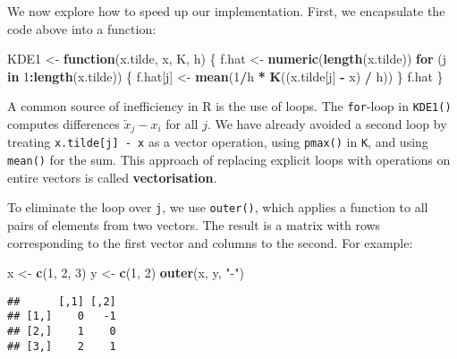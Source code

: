 \documentclass[
  a4paper,
]{article}
\newenvironment{Shaded}{\begin{snugshade}}{\end{snugshade}}
\newcommand{\ControlFlowTok}[1]{\textcolor[rgb]{0.13,0.29,0.53}{\textbf{#1}}}
\newcommand{\DecValTok}[1]{\textcolor[rgb]{0.00,0.00,0.81}{#1}}
\newcommand{\FunctionTok}[1]{\textcolor[rgb]{0.13,0.29,0.53}{\textbf{#1}}}
\newcommand{\NormalTok}[1]{#1}
\newcommand{\OtherTok}[1]{\textcolor[rgb]{0.56,0.35,0.01}{#1}}
\newcommand{\SpecialCharTok}[1]{\textcolor[rgb]{0.81,0.36,0.00}{\textbf{#1}}}
\newcommand{\StringTok}[1]{\textcolor[rgb]{0.31,0.60,0.02}{#1}}
\theoremstyle{definition}
\theoremstyle{definition}
\theoremstyle{definition}
\theoremstyle{definition}
\theoremstyle{remark}
\begin{document}
We now explore how to speed up our implementation.
First, we encapsulate the code above into a function:

\begin{Shaded}
\begin{Highlighting}[]
\NormalTok{KDE1 }\OtherTok{\textless{}{-}} \ControlFlowTok{function}\NormalTok{(x.tilde, x, K, h) \{}
\NormalTok{  f.hat }\OtherTok{\textless{}{-}} \FunctionTok{numeric}\NormalTok{(}\FunctionTok{length}\NormalTok{(x.tilde))}
  \ControlFlowTok{for}\NormalTok{ (j }\ControlFlowTok{in} \DecValTok{1}\SpecialCharTok{:}\FunctionTok{length}\NormalTok{(x.tilde)) \{}
\NormalTok{    f.hat[j] }\OtherTok{\textless{}{-}} \FunctionTok{mean}\NormalTok{(}\DecValTok{1}\SpecialCharTok{/}\NormalTok{h }\SpecialCharTok{*} \FunctionTok{K}\NormalTok{((x.tilde[j] }\SpecialCharTok{{-}}\NormalTok{ x) }\SpecialCharTok{/}\NormalTok{ h))}
\NormalTok{  \}}
\NormalTok{  f.hat}
\NormalTok{\}}
\end{Highlighting}
\end{Shaded}

A common source of inefficiency in R is the use of loops.
The \texttt{for}-loop in \texttt{KDE1()} computes differences \(\tilde x_j - x_i\) for all \(j\).
We have already avoided a second loop by treating \texttt{x.tilde{[}j{]}\ -\ x} as a vector
operation, using \texttt{pmax()} in \texttt{K}, and using \texttt{mean()} for the sum. This approach
of replacing explicit loops with operations on entire vectors is called \textbf{vectorisation}.

To eliminate the loop over \texttt{j}, we use \texttt{outer()}, which applies a function to all
pairs of elements from two vectors. The result is a matrix with rows corresponding
to the first vector and columns to the second. For example:

\begin{Shaded}
\begin{Highlighting}[]
\NormalTok{x }\OtherTok{\textless{}{-}} \FunctionTok{c}\NormalTok{(}\DecValTok{1}\NormalTok{, }\DecValTok{2}\NormalTok{, }\DecValTok{3}\NormalTok{)}
\NormalTok{y }\OtherTok{\textless{}{-}} \FunctionTok{c}\NormalTok{(}\DecValTok{1}\NormalTok{, }\DecValTok{2}\NormalTok{)}
\FunctionTok{outer}\NormalTok{(x, y, }\StringTok{"{-}"}\NormalTok{)}
\end{Highlighting}
\end{Shaded}

\begin{verbatim}
##      [,1] [,2]
## [1,]    0   -1
## [2,]    1    0
## [3,]    2    1
\end{verbatim}
\end{document}
